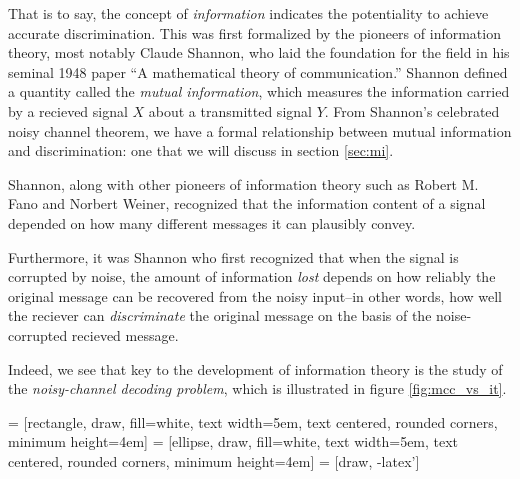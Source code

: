 That is to say, the concept of \emph{information} indicates the
potentiality to achieve accurate discrimination.  This was first
formalized by the pioneers of information theory, most notably Claude
Shannon, who laid the foundation for the field in his seminal 1948
paper ``A mathematical theory of communication.''  Shannon defined a
quantity called the \emph{mutual information}, which measures the
information carried by a recieved signal $X$ about a transmitted
signal $Y$.  From Shannon's celebrated noisy channel theorem, we have
a formal relationship between mutual information and discrimination:
one that we will discuss in section \ref{sec:mi}.


Shannon, along
with other pioneers of information theory such as Robert M. Fano and
Norbert Weiner, recognized that the information content of a signal
depended on how many different messages it can plausibly convey.



Furthermore, it was Shannon who first recognized that when the signal
is corrupted by noise, the amount of information \emph{lost} depends
on how reliably the original message can be recovered from the noisy
input--in other words, how well the reciever can \emph{discriminate}
the original message on the basis of the noise-corrupted recieved
message.  %

Indeed, we see that key to the development of information theory is
the study of the \emph{noisy-channel decoding problem}, which is
illustrated in figure \ref{fig:mcc_vs_it}.  %

 = [rectangle, draw, fill=white, 
    text width=5em, text centered, rounded corners, minimum height=4em]
 = [ellipse, draw, fill=white, 
    text width=5em, text centered, rounded corners, minimum height=4em]
 = [draw, -latex']
    
